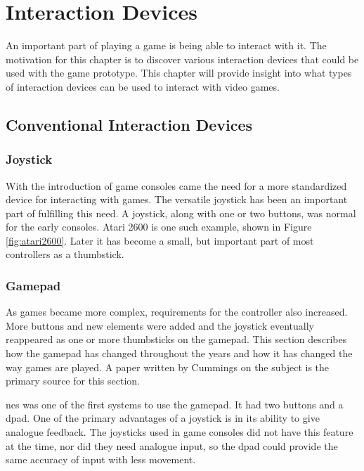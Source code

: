\chapter{Interaction Devices}
\label{chap:interaction}
An important part of playing a game is being able to interact with it. The motivation for this chapter is to discover various interaction devices that could be used with the game prototype. This chapter will provide insight into what types of interaction devices can be used to interact with video games.



\section{Conventional Interaction Devices}
\subsection{Joystick}
With the introduction of game consoles came the need for a more standardized device for interacting with games.
The versatile joystick has been an important part of fulfilling this need.
A joystick, along with one or two buttons, was normal for the early consoles.
Atari 2600 is one such example, shown in Figure \ref{fig:atari2600}.
Later it has become a small, but important part of most controllers as a thumbstick.
\subsection{Gamepad}
As games became more complex, requirements for the controller also increased.
More buttons and new elements were added and the joystick eventually reappeared as one or more thumbsticks on the gamepad.
This section describes how the gamepad has changed throughout the years and how it has changed the way games are played.
A paper written by Cummings \cite{cummings2007evolution} on the subject is the primary source for this section.

\gls{nes} was one of the first systems to use the gamepad.
It had two buttons and a \gls{dpad}.
One of the primary advantages of a joystick is in its ability to give analogue feedback.
The joysticks used in game consoles did not have this feature at the time, nor did they need analogue input, so the \gls{dpad} could provide the same accuracy of input with less movement.

